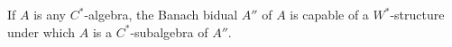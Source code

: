 If $A$ is any $C^*$-algebra, the Banach bidual $A''$ of $A$ is capable of a $W^*$-structure under which $A$ is a $C^*$-subalgebra of $A''$.
